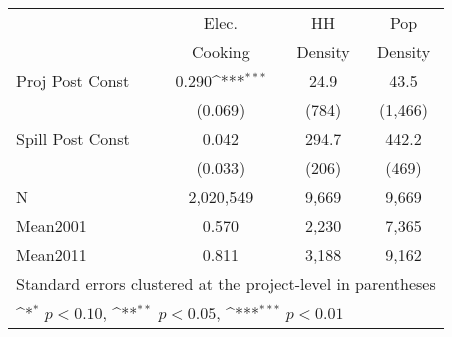 {
\def\sym#1{\ifmmode^{#1}\else\(^{#1}\)\fi}
\begin{tabular}{l*{3}{c}}
               &\multicolumn{1}{c}{Elec.}&\multicolumn{1}{c}{HH}&\multicolumn{1}{c}{Pop}\\
		&\multicolumn{1}{c}{Cooking}&\multicolumn{1}{c}{Density}&\multicolumn{1}{c}{Density}\\
\hline
Proj Post Const &    0.290\sym{***}      &   24.9         &   43.5        \\
 &  (0.069)             &(784)         &(1,466)         \\
[1em]
Spill Post Const &    0.042          &  294.7        &  442.2         \\
			 &  (0.033)           &(206)         &(469)         \\
\hline
N               &2,020,549           &9,669         &9,669        \\
Mean2001        &    0.570             &2,230         &7,365    \\
Mean2011       &    0.811             &3,188      &9,162       \\
\hline
\multicolumn{4}{l}{\footnotesize Standard errors clustered at the project-level in parentheses}\\
\multicolumn{4}{l}{\footnotesize \sym{*} \(p<0.10\), \sym{**} \(p<0.05\), \sym{***} \(p<0.01\)}\\
\end{tabular}
}
